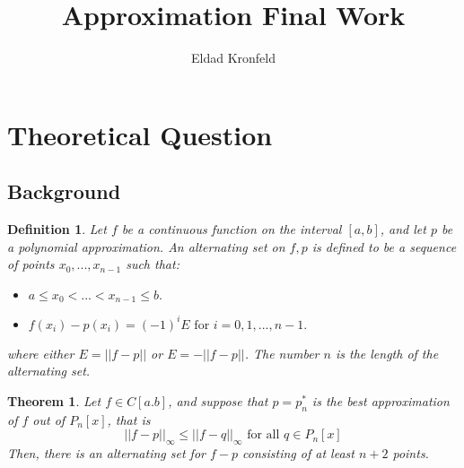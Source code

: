 \documentclass[]{article}
\title{Approximation Final Work}
\author{Eldad Kronfeld}
\date{}
\newtheorem{thm}{Theorem}[section]
\newtheorem{definition}{Definition}[]
\begin{document}
\maketitle
\tableofcontents

\newpage
\section{Theoretical Question }
\subsection{Background}
\begin{definition}
	Let $f$ be a continuous function on the interval $[a, b]$, and let $p$ be a polynomial approximation. An alternating set on $f, p$ is defined to be a sequence of points $x_{0}, ..., x_{n-1}$ such that:
	\begin{itemize}
	\item $a \leq x_0 <...<x_{n - 1}\leq b .$
	\item $f(x_i) - p(x_i) = (-1)^i E \text{ for } i=0,1,...,n-1.$ 
\end{itemize}
where either $E=||f-p||$ or $E=-||f-p||$. The number $n$ is the length of the alternating set.
\end{definition}


\begin{thm}
	\label{thm1}
	Let $f \in C[a.b]$, and suppose that $p=p^{*}_{n}$ is the best approximation of $f$ out of $P_{n}[x]$, that is
	\begin{equation}
		||f-p||_{\infty} \le ||f-q||_{\infty} \text{ for all } q\in P_{n}[x] 
	\end{equation}
	Then, there is an alternating set for $f-p$ consisting of at least $n+2$  points.
	
\end{thm}
\end{document}

